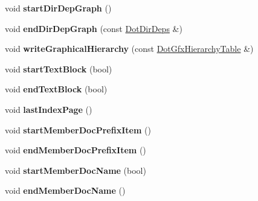 \begin{DoxyCompactItemize}
\item 
\hypertarget{class_man_generator_a071f06d58679ecf7077e1bb4335b798c}{void {\bfseries start\-Dir\-Dep\-Graph} ()}\label{class_man_generator_a071f06d58679ecf7077e1bb4335b798c}

\item 
\hypertarget{class_man_generator_a7f15432eebece4868b2a289c4fdf201e}{void {\bfseries end\-Dir\-Dep\-Graph} (const \hyperlink{class_dot_dir_deps}{Dot\-Dir\-Deps} \&)}\label{class_man_generator_a7f15432eebece4868b2a289c4fdf201e}

\item 
\hypertarget{class_man_generator_a74e60d52299a8b1d0e08397d3d362f48}{void {\bfseries write\-Graphical\-Hierarchy} (const \hyperlink{class_dot_gfx_hierarchy_table}{Dot\-Gfx\-Hierarchy\-Table} \&)}\label{class_man_generator_a74e60d52299a8b1d0e08397d3d362f48}

\item 
\hypertarget{class_man_generator_ae8ef4194fc15fa0d64074879660110f0}{void {\bfseries start\-Text\-Block} (bool)}\label{class_man_generator_ae8ef4194fc15fa0d64074879660110f0}

\item 
\hypertarget{class_man_generator_a478d722be3ebb3a3c0974f9f840a80e8}{void {\bfseries end\-Text\-Block} (bool)}\label{class_man_generator_a478d722be3ebb3a3c0974f9f840a80e8}

\item 
\hypertarget{class_man_generator_a9fcbfbb9afd01da287ac464c1da0d778}{void {\bfseries last\-Index\-Page} ()}\label{class_man_generator_a9fcbfbb9afd01da287ac464c1da0d778}

\item 
\hypertarget{class_man_generator_a69e0980a62e287e8543cc10ac407483b}{void {\bfseries start\-Member\-Doc\-Prefix\-Item} ()}\label{class_man_generator_a69e0980a62e287e8543cc10ac407483b}

\item 
\hypertarget{class_man_generator_a797315065ef118ee81fc1828eb5f7e5d}{void {\bfseries end\-Member\-Doc\-Prefix\-Item} ()}\label{class_man_generator_a797315065ef118ee81fc1828eb5f7e5d}

\item 
\hypertarget{class_man_generator_a75e84ed33d454731b67946c1eec42c8e}{void {\bfseries start\-Member\-Doc\-Name} (bool)}\label{class_man_generator_a75e84ed33d454731b67946c1eec42c8e}

\item 
\hypertarget{class_man_generator_ab8f5f35025a2dfa4026e02e5e586b27e}{void {\bfseries end\-Member\-Doc\-Name} ()}\label{class_man_generator_ab8f5f35025a2dfa4026e02e5e586b27e}


\end{DoxyCompactItemize}
